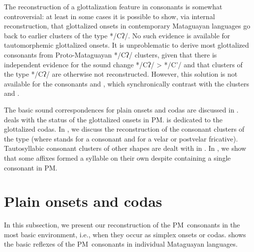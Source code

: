 The reconstruction of a glottalization feature in consonants is somewhat controversial: at least in some cases it is possible to show, via internal reconstruction, that glottalized onsets in contemporary Mataguayan languages go back to earlier clusters of the type */Cʔ/. No such evidence is available for tautomorphemic glottalized onsets. It is unproblematic to derive most glottalized consonants from Proto-Mataguayan */Cʔ/ clusters, given that there is independent evidence for the sound change */Cʔ/ > */C’/ and that clusters of the type */Cʔ/ are otherwise not reconstructed. However, this solution is not available for the consonants  and , which synchronically contrast with the clusters  and .

The basic sound correspondences for plain onsets and codas are discussed in .  deals with the status of the glottalized onsets in PM.  is dedicated to the glottalized codas. In , we discuss the reconstruction of the consonant clusters of the type  (where  stands for a consonant and  for a velar or postvelar fricative). Tautosyllabic consonant clusters of other shapes are dealt with in . In , we show that some affixes formed a syllable on their own despite containing a single consonant in PM.

\section{Plain onsets and codas}\label{simplex-C}
\sloppy
In this subsection, we present our reconstruction of the PM~consonants in the most basic environment, i.e., when they occur as simplex onsets or codas.  shows the basic reflexes of the PM~consonants in individual Mataguayan languages.

